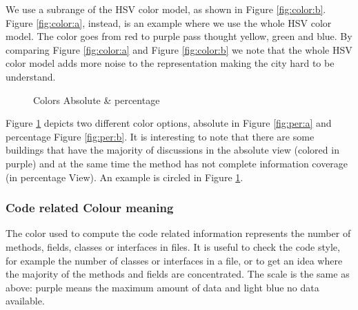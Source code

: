 \documentclass[]{usiinfbachelorproject}
\begin{document}
We use a subrange of the HSV color model, as shown in Figure \ref{fig:color:b}.
Figure \ref{fig:color:a}, instead, is an example where we use the whole HSV color model. The color goes from red to purple pass thought yellow, green and blue. 
By comparing Figure \ref{fig:color:a} and Figure \ref{fig:color:b} we note that the whole HSV color model adds more noise to the representation making the city hard to be understand.\begin{figure}[h]
\centering
{}
\hspace*{\fill}

\caption{Colors Absolute \& percentage}
\label{fig:per}
\end{figure}
Figure \ref{fig:per}  depicts two different color options, absolute in Figure \ref{fig:per:a} and percentage Figure \ref{fig:per:b}.
It is interesting to note that there are some buildings that have the majority of discussions in the absolute view (colored in purple) and at the same time the method has not complete information coverage (in percentage View). An example is circled in Figure \ref{fig:per}. 


\subsubsection{Code related Colour meaning}






The color used to compute the code related information represents  the number of methods, fields, classes or interfaces in files. It is useful to check the code style, for example the number of classes or interfaces in a file, or to get an idea where the majority of the methods and fields are concentrated. The scale is the same as above: purple means the maximum amount of  data and light blue no data available.
\end{document}
